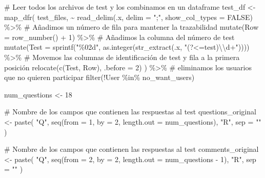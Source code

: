 \documentclass[
  12pt,
  a4paper,
  extrafontsizes,
  onecolumn,
  openright]{memoir}
\newenvironment{Shaded}{\begin{snugshade}}{\end{snugshade}}
\newcommand{\AttributeTok}[1]{\textcolor[rgb]{0.40,0.45,0.13}{#1}}
\newcommand{\CommentTok}[1]{\textcolor[rgb]{0.37,0.37,0.37}{#1}}
\newcommand{\ConstantTok}[1]{\textcolor[rgb]{0.56,0.35,0.01}{#1}}
\newcommand{\DecValTok}[1]{\textcolor[rgb]{0.68,0.00,0.00}{#1}}
\newcommand{\FunctionTok}[1]{\textcolor[rgb]{0.28,0.35,0.67}{#1}}
\newcommand{\NormalTok}[1]{\textcolor[rgb]{0.00,0.23,0.31}{#1}}
\newcommand{\OtherTok}[1]{\textcolor[rgb]{0.00,0.23,0.31}{#1}}
\newcommand{\SpecialCharTok}[1]{\textcolor[rgb]{0.37,0.37,0.37}{#1}}
\newcommand{\StringTok}[1]{\textcolor[rgb]{0.13,0.47,0.30}{#1}}
\begin{document}
\begin{Shaded}
\begin{Highlighting}[]
\CommentTok{\# Leer todos los archivos de test y los combinamos en un dataframe}
\NormalTok{test\_df }\OtherTok{\textless{}{-}} \FunctionTok{map\_dfr}\NormalTok{(}
\NormalTok{    test\_files, }\SpecialCharTok{\textasciitilde{}} \FunctionTok{read\_delim}\NormalTok{(.x, }\AttributeTok{delim =} \StringTok{";"}\NormalTok{, }\AttributeTok{show\_col\_types =} \ConstantTok{FALSE}\NormalTok{) }\SpecialCharTok{\%\textgreater{}\%}
        \CommentTok{\# Añadimos un número de fila para mantener la trazabilidad}
        \FunctionTok{mutate}\NormalTok{(}\AttributeTok{Row =} \FunctionTok{row\_number}\NormalTok{() }\SpecialCharTok{+} \DecValTok{1}\NormalTok{) }\SpecialCharTok{\%\textgreater{}\%} 
        \CommentTok{\# Añadimos la columna del número de test}
        \FunctionTok{mutate}\NormalTok{(}\AttributeTok{Test =} \FunctionTok{sprintf}\NormalTok{(}\StringTok{"\%02d"}\NormalTok{, }\FunctionTok{as.integer}\NormalTok{(}\FunctionTok{str\_extract}\NormalTok{(.x, }\StringTok{"(?\textless{}=test)}\SpecialCharTok{\textbackslash{}\textbackslash{}}\StringTok{d+"}\NormalTok{)))) }\SpecialCharTok{\%\textgreater{}\%}
        \CommentTok{\# Movemos las columnas de identificación de test y fila a la primera posición}
        \FunctionTok{relocate}\NormalTok{(}\FunctionTok{c}\NormalTok{(Test, Row), }\AttributeTok{.before =} \DecValTok{2}\NormalTok{) }
\NormalTok{) }\SpecialCharTok{\%\textgreater{}\%}
    \CommentTok{\# eliminamos los usuarios que no quieren participar}
    \FunctionTok{filter}\NormalTok{(}\SpecialCharTok{!}\NormalTok{User }\SpecialCharTok{\%in\%}\NormalTok{ no\_want\_users) }

\NormalTok{num\_questions }\OtherTok{\textless{}{-}} \DecValTok{18}

\CommentTok{\# Nombre de los campos que contienen las respuestas al test}
\NormalTok{questions\_original }\OtherTok{\textless{}{-}} \FunctionTok{paste}\NormalTok{(}
    \StringTok{"Q"}\NormalTok{, }\FunctionTok{seq}\NormalTok{(}\AttributeTok{from =} \DecValTok{1}\NormalTok{, }\AttributeTok{by =} \DecValTok{2}\NormalTok{, }\AttributeTok{length.out =}\NormalTok{ num\_questions), }\StringTok{"R"}\NormalTok{, }\AttributeTok{sep =} \StringTok{""}
\NormalTok{) }

\CommentTok{\# Nombre de los campos que contienen las respuestas al test}
\NormalTok{comments\_original }\OtherTok{\textless{}{-}} \FunctionTok{paste}\NormalTok{(}
    \StringTok{"Q"}\NormalTok{, }\FunctionTok{seq}\NormalTok{(}\AttributeTok{from =} \DecValTok{2}\NormalTok{, }\AttributeTok{by =} \DecValTok{2}\NormalTok{, }\AttributeTok{length.out =}\NormalTok{ num\_questions }\SpecialCharTok{{-}} \DecValTok{1}\NormalTok{), }\StringTok{"R"}\NormalTok{, }\AttributeTok{sep =} \StringTok{""}
\NormalTok{) }


\end{Highlighting}
\end{Shaded}
\end{document}

